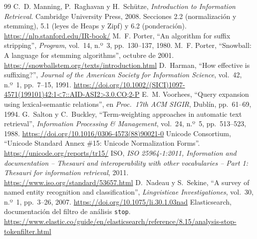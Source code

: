 \documentclass[11pt,spanish]{article}
\begin{document}
\begin{thebibliography}{99}
\setlength{\itemsep}{4pt}
 C.~D. Manning, P.~Raghavan y H.~Schütze, \textit{Introduction to Information Retrieval}. Cambridge University Press, 2008. Secciones 2.2 (normalización y stemming), 5.1 (leyes de Heaps y Zipf) y 6.2 (ponderación). \url{https://nlp.stanford.edu/IR-book/}
 M.~F. Porter, ``An algorithm for suffix stripping'', \textit{Program}, vol.~14, n.º~3, pp.~130--137, 1980.
 M.~F. Porter, ``Snowball: A language for stemming algorithms'', octubre de 2001. \url{https://snowballstem.org/texts/introduction.html}
 D.~Harman, ``How effective is suffixing?'', \textit{Journal of the American Society for Information Science}, vol.~42, n.º~1, pp.~7--15, 1991. \url{https://doi.org/10.1002/(SICI)1097-4571(199101)42:1<7::AID-ASI2>3.0.CO;2-P}
 E.~M. Voorhees, ``Query expansion using lexical-semantic relations'', en \textit{Proc.\ 17th ACM SIGIR}, Dublín, pp.~61--69, 1994.
 G.~Salton y C.~Buckley, ``Term-weighting approaches in automatic text retrieval'', \textit{Information Processing \& Management}, vol.~24, n.º~5, pp.~513--523, 1988. \url{https://doi.org/10.1016/0306-4573(88)90021-0}
 Unicode Consortium, ``Unicode Standard Annex \#15: Unicode Normalization Forms''. \url{https://unicode.org/reports/tr15/}
 ISO, \textit{ISO 25964-1:2011, Information and documentation -- Thesauri and interoperability with other vocabularies -- Part 1: Thesauri for information retrieval}, 2011. \url{https://www.iso.org/standard/53657.html}
 D.~Nadeau y S.~Sekine, ``A survey of named entity recognition and classification'', \textit{Lingvisticae Investigationes}, vol.~30, n.º~1, pp.~3--26, 2007. \url{https://doi.org/10.1075/li.30.1.03nad}
 Elasticsearch, documentación del filtro de análisis \texttt{stop}. \url{https://www.elastic.co/guide/en/elasticsearch/reference/8.15/analysis-stop-tokenfilter.html}
\end{thebibliography}
\end{document}
